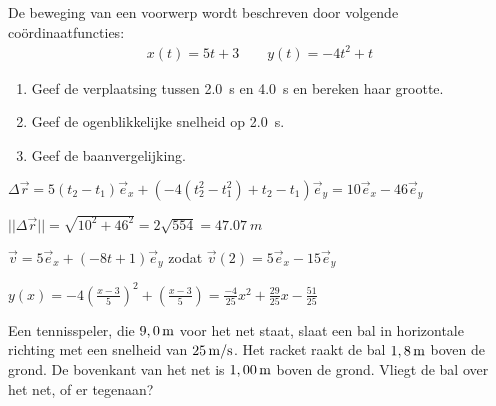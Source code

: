 \begin{exercise} De beweging van een voorwerp wordt beschreven door volgende co\"ordinaatfuncties:
\begin{eqnarray*}
	x(t)=5t+3\qquad y(t)=-4t^2+t
\end{eqnarray*}
\begin{enumerate}
\item Geef de verplaatsing tussen \SI{2,0}{s} en \SI{4,0}{s} en bereken haar grootte.
\item Geef de ogenblikkelijke snelheid op \SI{2,0}{s}.
\item Geef de baanvergelijking.
\end{enumerate}

\begin{oplossing}
$\Delta\vec{r}=5(t_2-t_1)\vec{e}_x+(-4(t_2^2-t_1^2)+t_2-t_1)\vec{e}_y=10\vec{e}_x-46\vec{e}_y$

$||\Delta\vec{r}||=\sqrt{10^2+46^2}=2\sqrt{554}=\SI{47,07}{m}$

$\vec{v}=5\vec{e}_x+(-8t+1)\vec{e}_y$ zodat $\vec{v}(2)=5\vec{e}_x-15\vec{e}_y$

$y(x)=-4\left(\frac{x-3}{5}\right)^2+\left(\frac{x-3}{5}\right)=\frac{-4}{25}x^{2} + \frac{29}{25}x - \frac{51}{25}$

\end{oplossing}




\end{exercise}

\begin{exercise} Een tennisspeler, die $9,0\rm\,m$ voor het net staat, slaat
een bal in horizontale richting met een snelheid van $25\rm\,m/s$.
Het racket raakt de bal $1,8\rm\,m$ boven de grond. De bovenkant van
het net is $1,00\rm\,m$ boven de grond. Vliegt de bal over het net,
of er tegenaan?



\end{exercise}

